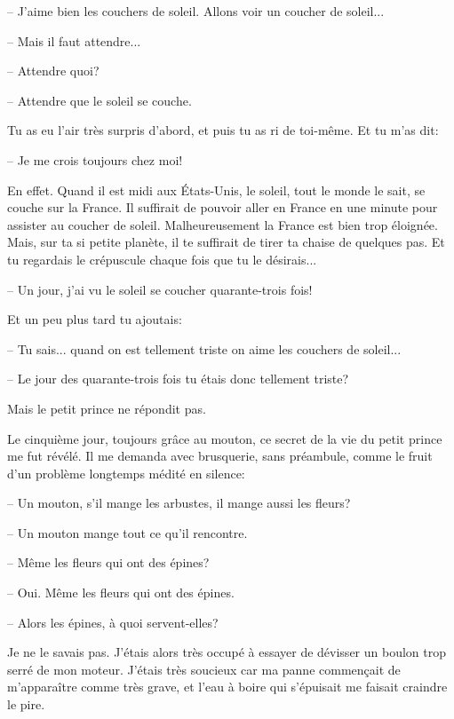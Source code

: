 \documentclass[a4paper]{report}
\begin{document}
-- J'aime bien les couchers de soleil. Allons voir un coucher de soleil...

-- Mais il faut attendre...

-- Attendre quoi?

-- Attendre que le soleil se couche.

Tu as eu l'air très surpris d'abord, et puis tu as ri de toi-même. Et tu m'as dit:

-- Je me crois toujours chez moi!

En effet. Quand il est midi aux États-Unis, le soleil, tout le monde le sait, se couche sur la France. Il suffirait de pouvoir aller en France en une minute pour assister au coucher de soleil. Malheureusement la France est bien trop éloignée. Mais, sur ta si petite planète, il te suffirait de tirer ta chaise de quelques pas. Et tu regardais le crépuscule chaque fois que tu le désirais...

-- Un jour, j'ai vu le soleil se coucher quarante-trois fois!

Et un peu plus tard tu ajoutais:

-- Tu sais... quand on est tellement triste on aime les couchers de soleil...

-- Le jour des quarante-trois fois tu étais donc tellement triste?

Mais le petit prince ne répondit pas. 


\parachapter[VII]{} %
Le cinquième jour, toujours grâce au mouton, ce secret de la vie du petit prince me fut révélé. Il me demanda avec brusquerie, sans préambule, comme le fruit d'un problème longtemps médité en silence:

-- Un mouton, s'il mange les arbustes, il mange aussi les fleurs?

-- Un mouton mange tout ce qu'il rencontre.

-- Même les fleurs qui ont des épines?

-- Oui. Même les fleurs qui ont des épines.

-- Alors les épines, à quoi servent-elles?

Je ne le savais pas. J'étais alors très occupé à essayer de dévisser un boulon trop serré de mon moteur. J'étais très soucieux car ma panne commençait de m'apparaître comme très grave, et l'eau à boire qui s'épuisait me faisait craindre le pire.
\end{document}
